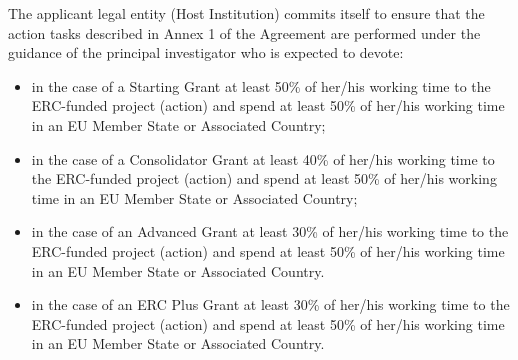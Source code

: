 \documentclass[12pt,a4paper]{article}
\begin{document}
The applicant legal entity (Host Institution) commits itself to ensure that the
action tasks described in Annex 1 of the Agreement are performed under the
guidance of the principal investigator who is expected to devote:
\begin{itemize}
    \item in the case of a Starting Grant at least 50\% of her/his working time to
    the ERC-funded project (action) and spend at least 50\% of her/his working
    time in an EU Member State or Associated Country;

    \item in the case of a Consolidator Grant at least 40\% of her/his working
    time to the ERC-funded project (action) and spend at least 50\% of her/his
    working time in an EU Member State or Associated Country;

    \item in the case of an Advanced Grant at least 30\% of her/his working time
    to the ERC-funded project (action) and spend at least 50\% of her/his
    working time in an EU Member State or Associated Country.

    \item in the case of an ERC Plus Grant at least 30\% of her/his working time to the
    ERC-funded project (action) and spend at least 50\% of her/his working time in an EU
    Member State or Associated Country.
\end{itemize}
\end{document}
